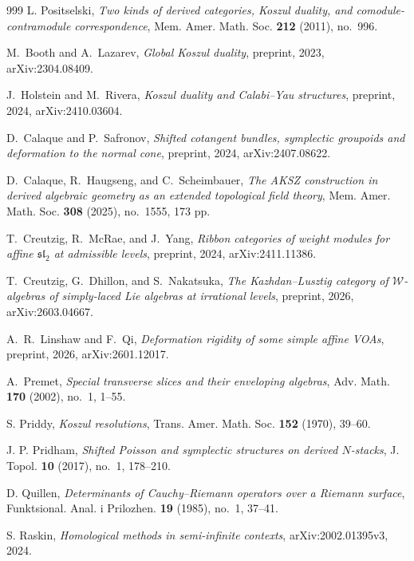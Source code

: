 \begin{thebibliography}{999}
L. Positselski, \emph{Two kinds of derived categories, Koszul duality, and comodule-contramodule correspondence}, Mem. Amer. Math. Soc. \textbf{212} (2011), no.~996.


M.~Booth and A.~Lazarev, \emph{Global Koszul duality}, preprint, 2023, arXiv:2304.08409.

J.~Holstein and M.~Rivera, \emph{Koszul duality and Calabi--Yau structures}, preprint, 2024, arXiv:2410.03604.

D.~Calaque and P.~Safronov, \emph{Shifted cotangent bundles, symplectic groupoids and deformation to the normal cone}, preprint, 2024, arXiv:2407.08622.

D.~Calaque, R.~Haugseng, and C.~Scheimbauer, \emph{The AKSZ construction in derived algebraic geometry as an extended topological field theory}, Mem. Amer. Math. Soc. \textbf{308} (2025), no.~1555, 173 pp.

T.~Creutzig, R.~McRae, and J.~Yang, \emph{Ribbon categories of weight modules for affine $\mathfrak{sl}_2$ at admissible levels}, preprint, 2024, arXiv:2411.11386.

T.~Creutzig, G.~Dhillon, and S.~Nakatsuka, \emph{The Kazhdan--Lusztig category of $\mathcal W$-algebras of simply-laced Lie algebras at irrational levels}, preprint, 2026, arXiv:2603.04667.

A.~R.~Linshaw and F.~Qi, \emph{Deformation rigidity of some simple affine VOAs}, preprint, 2026, arXiv:2601.12017.

A.~Premet, \emph{Special transverse slices and their enveloping algebras}, Adv. Math. \textbf{170} (2002), no.~1, 1--55.

S. Priddy, \emph{Koszul resolutions}, Trans. Amer. Math. Soc. \textbf{152} (1970), 39--60.

J. P. Pridham, \emph{Shifted Poisson and symplectic structures on derived $N$-stacks}, J. Topol. \textbf{10} (2017), no.~1, 178--210.

D. Quillen, \emph{Determinants of Cauchy--Riemann operators over a Riemann surface}, Funktsional. Anal. i Prilozhen. \textbf{19} (1985), no.~1, 37--41.

S. Raskin, \emph{Homological methods in semi-infinite contexts}, arXiv:2002.01395v3, 2024.


\end{thebibliography}
